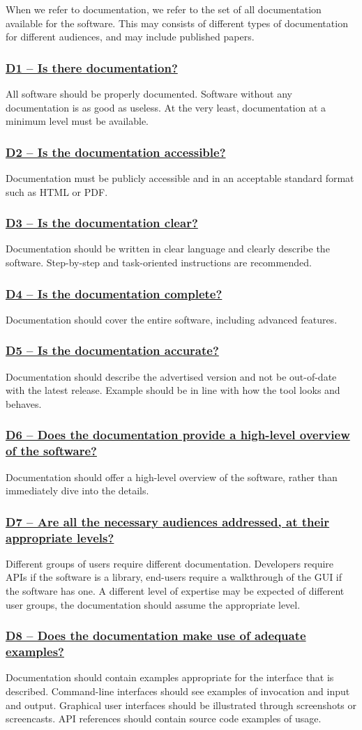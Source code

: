 \documentclass[a4paper,11pt]{article}
\newcommand{\criterion}[1]{\subsubsection*{\underline{#1}}}
\begin{document}
When we refer to documentation, we refer to the set of all documentation
available for the software. This may consists of different types of
documentation for different audiences, and may include published papers.

\criterion{D1 -- Is there documentation?}

All software should be properly documented. Software without any documentation
is as good as useless. At the very least, documentation at a minimum level
must be available. 

\criterion{D2 -- Is the documentation accessible?}

Documentation must be publicly accessible and in an acceptable standard format
such as HTML or PDF.

\criterion{D3 -- Is the documentation clear?}

Documentation should be written in clear language and clearly describe the software.
Step-by-step and task-oriented instructions are recommended.

\criterion{D4 -- Is the documentation complete?}

Documentation should cover the entire software, including advanced features.

\criterion{D5 -- Is the documentation accurate?}

Documentation should describe the advertised version and not be out-of-date
with the latest release. Example should be in line with how the tool looks and
behaves.

\criterion{D6 -- Does the documentation provide a high-level overview of the software?}

Documentation should offer a high-level overview of the software, rather
than immediately dive into the details.

\criterion{D7 -- Are all the necessary audiences addressed, at their appropriate levels?}

Different groups of users require different documentation. Developers require
APIs if the software is a library, end-users require a walkthrough of the GUI
if the software has one. A different level of expertise may be expected of
different user groups, the documentation should assume the appropriate level.

\criterion{D8 -- Does the documentation make use of adequate examples?}

Documentation should contain examples appropriate for the interface that is
described. Command-line interfaces should see examples of invocation and input
and output. Graphical user interfaces should be illustrated through screenshots or
screencasts. API references should contain source code examples of usage.
\end{document}
